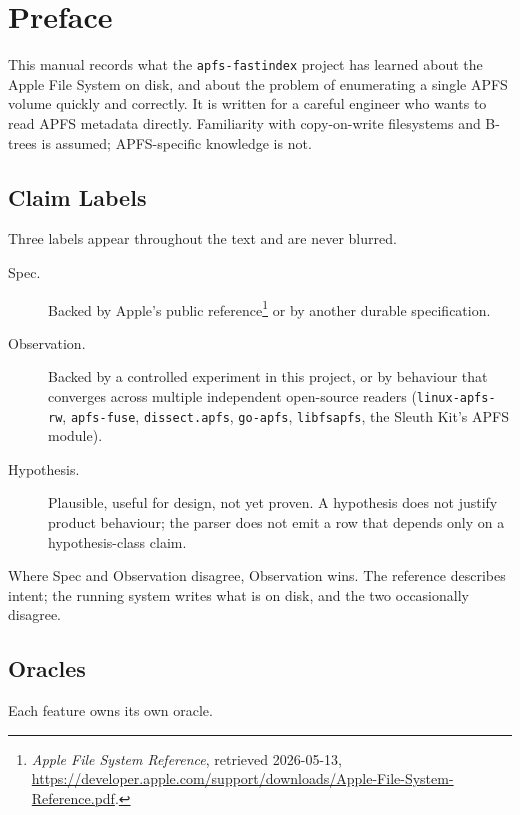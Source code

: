 \chapter*{Preface}

This manual records what the \texttt{apfs-fastindex} project has
learned about the Apple File System on disk, and about the problem
of enumerating a single APFS volume quickly and correctly. It is
written for a careful engineer who wants to read APFS metadata
directly. Familiarity with copy-on-write filesystems and B-trees is
assumed; APFS-specific knowledge is not.

\section*{Claim Labels}

Three labels appear throughout the text and are never blurred.

\begin{description}
  \item[Spec.] Backed by Apple's public reference\footnote{\emph{Apple
    File System Reference}, retrieved 2026-05-13,
    \url{https://developer.apple.com/support/downloads/Apple-File-System-Reference.pdf}.}
    or by another durable specification.
  \item[Observation.] Backed by a controlled experiment in this
    project, or by behaviour that converges across multiple
    independent open-source readers
    (\texttt{linux-apfs-rw}, \texttt{apfs-fuse}, \texttt{dissect.apfs},
    \texttt{go-apfs}, \texttt{libfsapfs}, the Sleuth Kit's APFS
    module).
  \item[Hypothesis.] Plausible, useful for design, not yet proven.
    A hypothesis does not justify product behaviour; the parser does
    not emit a row that depends only on a hypothesis-class claim.
\end{description}

Where Spec and Observation disagree, Observation wins. The reference
describes intent; the running system writes what is on disk, and the
two occasionally disagree.

\section*{Oracles}

Each feature owns its own oracle.

